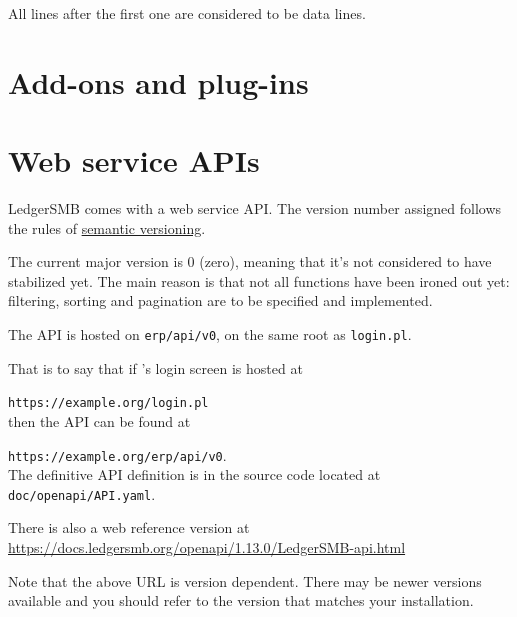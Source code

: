 All lines after the first one are considered to be data lines.

\chapter{Add-ons and plug-ins}
\label{cha-customization-add-ons}

\chapter{Web service APIs}
\label{cha-customization-web-service-api}

LedgerSMB comes with a web service \gls{API}. 
The version number assigned follows the rules of \href{https://semver.org/}{semantic versioning}. 

The current major version is 0 (zero), meaning that it's not considered to have stabilized
yet. The main reason is that not all functions have been ironed out yet:
filtering, sorting and pagination are to be specified and implemented.

The API is hosted on \texttt{erp/api/v0}, on the same root as \texttt{login.pl}. 

That is to say that if \lsmb's login screen is hosted at

\texttt{https://example.org/login.pl} \\

then the API can be found at

\texttt{https://example.org/erp/api/v0}.  \\

The definitive API definition is in the source code located at
\texttt{doc/openapi/API.yaml}.

There is also a web reference version at \\
\url{https://docs.ledgersmb.org/openapi/1.13.0/LedgerSMB-api.html}

Note that the above URL is \lsmbsp version dependent. There may be newer versions available and
you should refer to the version that matches your installation.
